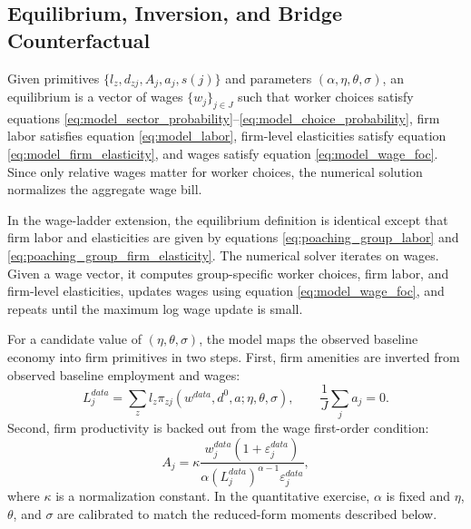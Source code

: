 \documentclass[12pt]{article}
\begin{document}
\subsection{Equilibrium, Inversion, and Bridge Counterfactual}
Given primitives \(\{l_z,d_{zj},A_j,a_j,s(j)\}\) and parameters \((\alpha,\eta,\theta,\sigma)\), an equilibrium is a vector of wages \(\{w_j\}_{j\in J}\) such that worker choices satisfy equations \eqref{eq:model_sector_probability}--\eqref{eq:model_choice_probability}, firm labor satisfies equation \eqref{eq:model_labor}, firm-level elasticities satisfy equation \eqref{eq:model_firm_elasticity}, and wages satisfy equation \eqref{eq:model_wage_foc}. Since only relative wages matter for worker choices, the numerical solution normalizes the aggregate wage bill.

In the wage-ladder extension, the equilibrium definition is identical except that firm labor and elasticities are given by equations \eqref{eq:poaching_group_labor} and \eqref{eq:poaching_group_firm_elasticity}. The numerical solver iterates on wages. Given a wage vector, it computes group-specific worker choices, firm labor, and firm-level elasticities, updates wages using equation \eqref{eq:model_wage_foc}, and repeats until the maximum log wage update is small.

For a candidate value of \((\eta,\theta,\sigma)\), the model maps the observed baseline economy into firm primitives in two steps. First, firm amenities are inverted from observed baseline employment and wages:
\begin{equation}
    L_j^{data}
    =
    \sum_z l_z
    \pi_{zj}\left(w^{data},d^0,a;\eta,\theta,\sigma\right),
    \qquad
    \frac{1}{J}\sum_j a_j=0.
    \label{eq:model_amenity_inversion}
\end{equation}
Second, firm productivity is backed out from the wage first-order condition:
\begin{equation}
    A_j
    =
    \kappa
    \frac{
    w_j^{data}\left(1+\varepsilon_j^{data}\right)
    }{
    \alpha \left(L_j^{data}\right)^{\alpha-1}\varepsilon_j^{data}
    },
    \label{eq:model_productivity_inversion}
\end{equation}
where \(\kappa\) is a normalization constant. In the quantitative exercise, \(\alpha\) is fixed and \(\eta\), \(\theta\), and \(\sigma\) are calibrated to match the reduced-form moments described below.
\end{document}
